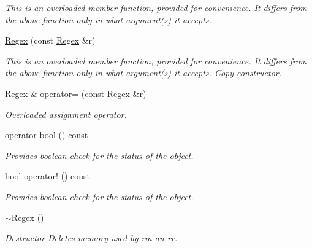 \begin{DoxyCompactItemize}
\begin{DoxyCompactList}\small\item\em This is an overloaded member function, provided for convenience. It differs from the above function only in what argument(s) it accepts. \end{DoxyCompactList}\item 
\hyperlink{classjpcre2_1_1Regex_ae03bb99a5bc8f945e693ddc34706f0c0_ae03bb99a5bc8f945e693ddc34706f0c0}{Regex} (const \hyperlink{classjpcre2_1_1Regex}{Regex} \&r)
\begin{DoxyCompactList}\small\item\em This is an overloaded member function, provided for convenience. It differs from the above function only in what argument(s) it accepts. Copy constructor. \end{DoxyCompactList}\item 
\hyperlink{classjpcre2_1_1Regex}{Regex} \& \hyperlink{classjpcre2_1_1Regex_ab43a14b4b6e75b7fa3221bc18a1d4121_ab43a14b4b6e75b7fa3221bc18a1d4121}{operator=} (const \hyperlink{classjpcre2_1_1Regex}{Regex} \&r)
\begin{DoxyCompactList}\small\item\em Overloaded assignment operator. \end{DoxyCompactList}\item 
\hyperlink{classjpcre2_1_1Regex_a9070a9f3adcaebccca5d15b247b93fda_a9070a9f3adcaebccca5d15b247b93fda}{operator bool} () const
\begin{DoxyCompactList}\small\item\em Provides boolean check for the status of the object. \end{DoxyCompactList}\item 
bool \hyperlink{classjpcre2_1_1Regex_afe102e21a96f5cfe12621746f899fa25_afe102e21a96f5cfe12621746f899fa25}{operator!} () const
\begin{DoxyCompactList}\small\item\em Provides boolean check for the status of the object. \end{DoxyCompactList}\item 
\hypertarget{classjpcre2_1_1Regex_a12b2bf254b59d7967681b77795c49260}{}\label{classjpcre2_1_1Regex_a12b2bf254b59d7967681b77795c49260} 
\hyperlink{classjpcre2_1_1Regex_a12b2bf254b59d7967681b77795c49260}{$\sim$\+Regex} ()
\begin{DoxyCompactList}\small\item\em Destructor Deletes memory used by \hyperlink{classjpcre2_1_1Regex_a447925705d222dbbd8c7d60b98cc65f0}{rm} an \hyperlink{classjpcre2_1_1Regex_a5a7ac6c6288988079b8933b4b6637fab}{rr}. \end{DoxyCompactList}\item 

\end{DoxyCompactItemize}
